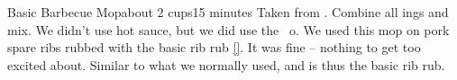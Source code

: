 \newpage
\begin{recipe}{Basic Barbecue Mop}{about 2 cups}{15 minutes}
\freeform Taken from \emph{}.
Combine all ings and mix.
\freeform We didn't use hot sauce, but we did use the ~o.  We used this mop on pork spare ribs rubbed with the basic rib rub \ref{}.  It was fine -- nothing to get too excited about.  Similar to what we normally used, and is thus the basic rib rub.
\end{recipe}

